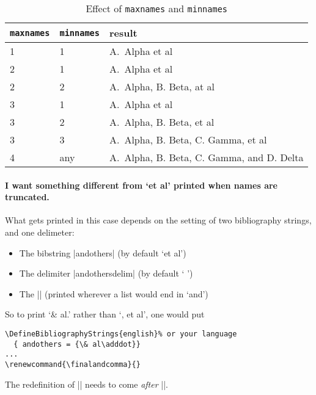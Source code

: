 \begin{table}
\begin{tabularx}{\textwidth}{llX}
\toprule
\texttt{maxnames} & \texttt{minnames} & \textsf{result} \\
\midrule
1                 &  1                & A.\ Alpha et al \\
2                 &  1                & A.\ Alpha et al \\
2                 &  2                & A.\ Alpha, B. Beta, at al \\
3                 &  1                & A.\ Alpha et al \\
3                 &  2                & A.\ Alpha, B. Beta, et al \\
3                 &  3                & A.\ Alpha, B. Beta, C. Gamma, et al \\
4                 &  any              & A.\ Alpha, B. Beta, C. Gamma, and D. Delta \\
\bottomrule
\end{tabularx}
\caption{Effect of \texttt{maxnames} and \texttt{minnames}\label{maxnames}}
\end{table}

\paragraph{I want something different from `et al' printed when names
  are truncated.} What gets printed in this case depends on the
setting of two bibliography strings, and one delimeter:
\begin{itemize}
\item The bibstring |andothers| (by default `et al')
\item The delimiter |andothersdelim| (by default ` ')
\item The |\finalandcomma| (printed wherever a list would end in
  `and')
\end{itemize}
So to print `\& al.' rather than `, et al', one would put
\begin{Verbatim}
\DefineBibliographyStrings{english}% or your language
  { andothers = {\& al\adddot}}
...
\renewcommand{\finalandcomma}{}
\end{Verbatim}
The redefinition of |\finalandcomma| needs to come \emph{after}
||.

